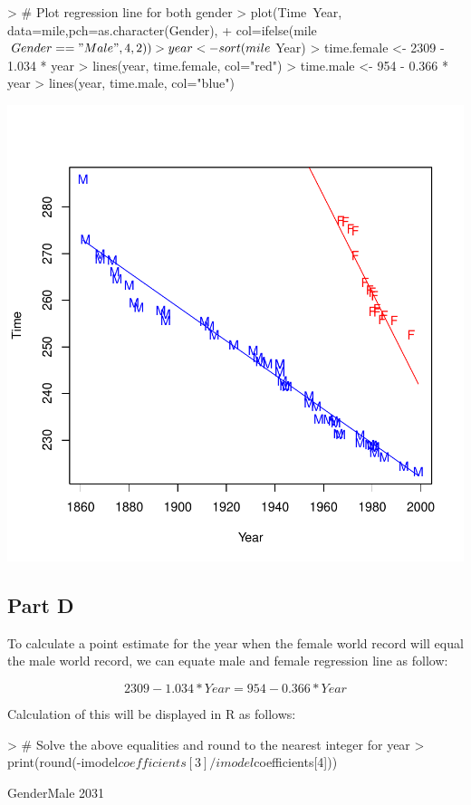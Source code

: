 \documentclass{article}
\begin{document}
\begin{Schunk}
\begin{Sinput}
> # Plot regression line for both gender
> plot(Time~Year, data=mile,pch=as.character(Gender), 
+      col=ifelse(mile$Gender=="Male", 4, 2))
> year <- sort(mile$Year)
> time.female <- 2309 - 1.034 * year
> lines(year, time.female, col="red")
> time.male <-  954 - 0.366 * year
> lines(year, time.male, col="blue")
\end{Sinput}
\end{Schunk}
\includegraphics{Assignment3-010}

\subsection{Part D}
To calculate a point estimate for the year when the female world record will equal the male world record, we can equate male and female regression line as follow:

\begin{equation*}
  2309 - 1.034 * Year = 954 - 0.366 * Year
\end{equation*}

\noindent Calculation of this will be displayed in R as follows:
\begin{Schunk}
\begin{Sinput}
> # Solve the above equalities and round to the nearest integer for year
> print(round(-imodel$coefficients[3] / imodel$coefficients[4]))
\end{Sinput}
\begin{Soutput}
GenderMale 
      2031 
\end{Soutput}
\end{Schunk}
\end{document}
